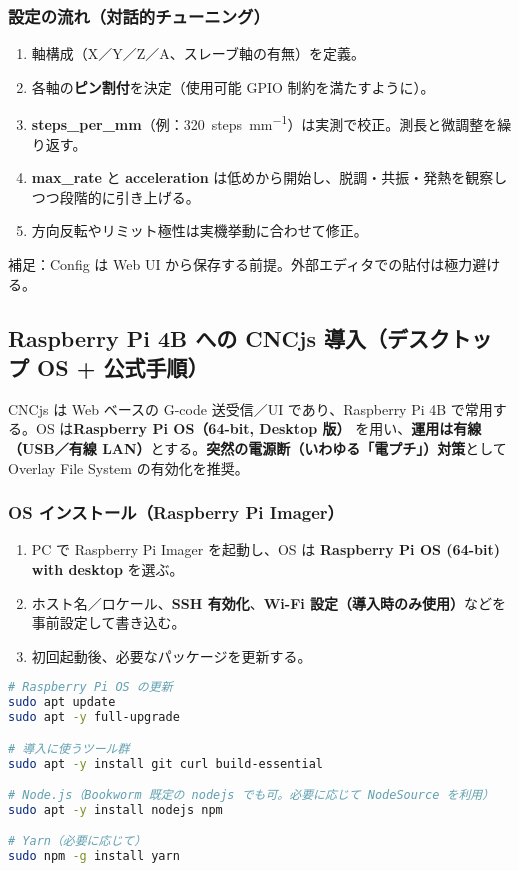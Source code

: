 \documentclass[uplatex,dvipdfmx]{ujarticle}
\begin{document}
\subsubsection*{設定の流れ（対話的チューニング）}
\begin{enumerate}
  \item 軸構成（X／Y／Z／A、スレーブ軸の有無）を定義。
  \item 各軸の\textbf{ピン割付}を決定（使用可能 GPIO 制約を満たすように）。
  \item \textbf{steps\_per\_mm}（例：\SI{320}{steps\per\milli\meter}）は実測で校正。測長と微調整を繰り返す。
  \item \textbf{max\_rate} と \textbf{acceleration} は低めから開始し、脱調・共振・発熱を観察しつつ段階的に引き上げる。
  \item 方向反転やリミット極性は実機挙動に合わせて修正。
\end{enumerate}

\noindent 補足：Config は Web UI から保存する前提。外部エディタでの貼付は極力避ける。

\subsection{Raspberry Pi 4B への CNCjs 導入（デスクトップ OS + 公式手順）}

CNCjs\cite{cncjs-site} は Web ベースの G-code 送受信／UI であり、Raspberry Pi 4B で常用する。OS は\textbf{Raspberry Pi OS（64-bit, Desktop 版）} \cite{rpi-os}を用い、\textbf{運用は有線（USB／有線 LAN）}とする。\textbf{突然の電源断（いわゆる「電プチ」）対策}として Overlay File System の有効化を推奨\cite{rpi-config,rpi-overlay-wp}。
\subsubsection*{OS インストール（Raspberry Pi Imager）}
\begin{enumerate}
  \item PC で Raspberry Pi Imager を起動し\cite{rpi-imager}、OS は \textbf{Raspberry Pi OS (64-bit) with desktop} を選ぶ。
  \item ホスト名／ロケール、\textbf{SSH 有効化}、\textbf{Wi-Fi 設定（導入時のみ使用）}などを事前設定して書き込む\cite{rpi-imager-adv}。
  \item 初回起動後、必要なパッケージを更新する。
\end{enumerate}

\begin{lstlisting}[caption=初期パッケージ導入（APT）, label=code:apt-init, language=bash]
# Raspberry Pi OS の更新
sudo apt update
sudo apt -y full-upgrade

# 導入に使うツール群
sudo apt -y install git curl build-essential

# Node.js（Bookworm 既定の nodejs でも可。必要に応じて NodeSource を利用）
sudo apt -y install nodejs npm

# Yarn（必要に応じて）
sudo npm -g install yarn
\end{lstlisting}
\end{document}
